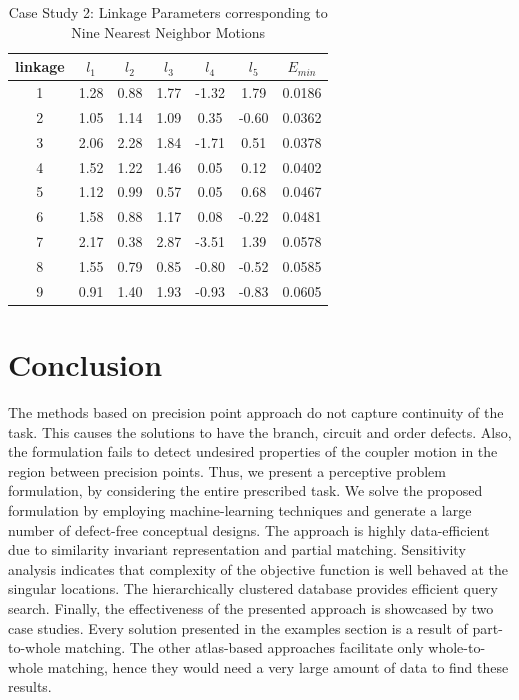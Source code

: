 \documentclass[twocolumn,10pt]{asme2ej}
\begin{document}
\begin{table}
\caption{Case Study 2: Linkage Parameters corresponding to Nine Nearest Neighbor Motions}
\centering
\label{ex2_knnLinkageData}
\begin{tabular}{ccccccc}
\hline
  linkage & $l_1$ & $l_2$ & $l_3$ & $l_4$ & $l_5$ & $E_{min}$ \\
\hline
 1 & 1.28 & 0.88 & 1.77 & -1.32 & 1.79 & 0.0186   \\
 2 & 1.05 & 1.14 & 1.09 & 0.35 & -0.60 & 0.0362   \\
 3 & 2.06 & 2.28 & 1.84 & -1.71 & 0.51 & 0.0378   \\
 4 & 1.52 & 1.22 & 1.46 & 0.05 & 0.12 & 0.0402    \\
 5 & 1.12 & 0.99 & 0.57 & 0.05 & 0.68 & 0.0467    \\
 6 & 1.58 & 0.88 & 1.17 & 0.08 & -0.22 & 0.0481   \\
 7 & 2.17 & 0.38 & 2.87 & -3.51 & 1.39 & 0.0578   \\
 8 & 1.55 & 0.79 & 0.85 & -0.80 & -0.52 & 0.0585  \\
 9 & 0.91 & 1.40 & 1.93 & -0.93 & -0.83 & 0.0605
\end{tabular}
\end{table}




\section*{Conclusion}
The methods based on precision point approach do not capture continuity of the task.
This causes the solutions to have the branch, circuit and order defects.
Also, the formulation fails to detect undesired properties of the coupler motion in the region between precision points.
Thus, we present a perceptive problem formulation, by considering the entire prescribed task.
We solve the proposed formulation by employing machine-learning techniques and generate a large number of defect-free conceptual designs.
The approach is highly data-efficient due to similarity invariant representation and partial matching.
Sensitivity analysis indicates that complexity of the objective function is well behaved at the singular locations.
The hierarchically clustered database provides efficient query search.
Finally, the effectiveness of the presented approach is showcased by two case studies.
Every solution presented in the examples section is a result of part-to-whole matching.
The other atlas-based approaches facilitate only whole-to-whole matching, hence they would need a very large amount of data to find these results.
\end{document}
